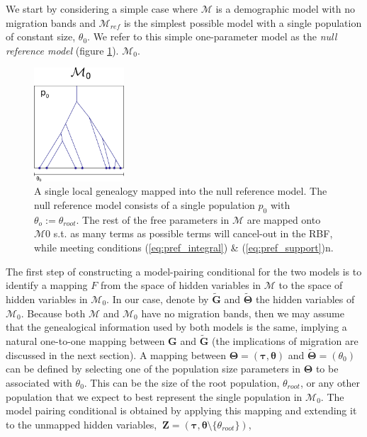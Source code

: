 \documentclass[11pt]{article}
\newcommand{\vect}[1]{\boldsymbol{\mathbf{#1}}}
\newcommand{\M}{\mathcal{M}}
\newcommand{\G}{\vect{G}}
\newcommand{\T}{\vect{\Theta}}
\newcommand{\Mref}{\M_{ref}}
\newcommand{\Gref}{\widetilde{\G}}
\newcommand{\Tref}{\widetilde{\T}}
\newcommand{\1}{\mathbbm{1}}
\newcommand{\Z}{\vect{Z}}
\newcommand{\troot}{\theta_{root}}
\newcommand{\taus}{\vect\tau}
\newcommand{\thetas}{\vect\theta}
\begin{document}
We start by considering a simple case where $\M$ is a demographic model with no migration bands and $\Mref$
is the simplest possible model with a single population of constant size, $\theta_0$.
%
We refer to this simple one-parameter model as the {\em null reference model} (figure \ref{fig:null_model_single_genealogy}). $\M_0$.
%
\begin{figure}[h]
\centering
\includegraphics[width=0.3\textwidth]
{null_model_single_genealogy}
\captionsetup{width=.8\textwidth}
\caption{A single local genealogy mapped into the null reference model. The null reference model consists of a single population $p_0$ with $\theta_o := \theta_{root}$. The rest of the free parameters in $\M$ are mapped onto $\M0$ s.t. as many terms as possible terms will cancel-out in the RBF, while meeting conditions (\ref{eq:pref_integral}) \& (\ref{eq:pref_support})n.}
\label{fig:null_model_single_genealogy}
\end{figure}
%
{The first step} of constructing a model-pairing conditional for the two models is to identify a mapping $F$ from the space
of hidden variables in $\M$ to the space of hidden variables in $\M_0$.
%
In our case, denote by $\Gref$ and $\Tref$ the hidden variables of $\M_0$.
%
Because both $\M$ and $\M_0$ have no migration bands, then we may assume that the genealogical information used
by both models is the same, implying a natural one-to-one mapping between $\G$ and $\Gref$ (the implications of migration are discussed in the next section).
%
A mapping between $\T=(\taus,\thetas)$ and $\Tref=(\theta_0)$ can be defined by selecting one of the population size parameters in $\T$
to be associated with $\theta_0$. This can be the size of the root population, $\troot$, or any other population
that we expect to best represent the single population in $\M_0$.
%
The model pairing conditional is obtained by applying this mapping and extending it to the unmapped hidden variables, $~ \Z=(\taus,\thetas\setminus \{\troot\})$,
\end{document}
